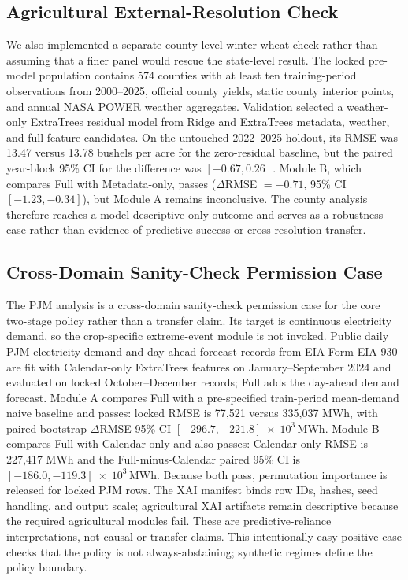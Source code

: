 \documentclass[conference]{IEEEtran}
\begin{document}
\subsection{Agricultural External-Resolution Check}
We also implemented a separate county-level winter-wheat check rather than
assuming that a finer panel would rescue the state-level result. The locked
pre-model population contains 574 counties with at least ten training-period
observations from 2000--2025, official county yields, static county interior
points, and annual NASA POWER weather aggregates. Validation selected a
weather-only ExtraTrees residual model from Ridge and ExtraTrees metadata,
weather, and full-feature candidates. On the untouched 2022--2025 holdout, its
RMSE was 13.47 versus 13.78 bushels per acre for the zero-residual baseline, but
the paired year-block 95\% CI for the difference was $[-0.67,0.26]$. Module B,
which compares Full with Metadata-only, passes ($\Delta$RMSE $=-0.71$, 95\% CI
$[-1.23,-0.34]$), but Module A remains inconclusive. The county analysis therefore
reaches a model-descriptive-only outcome and serves as a robustness case rather
than evidence of predictive success or cross-resolution transfer.

\subsection{Cross-Domain Sanity-Check Permission Case}
The PJM analysis is a cross-domain sanity-check permission case for the core
two-stage policy rather than a transfer claim. Its target is continuous electricity
demand, so the crop-specific extreme-event module is not invoked. Public daily PJM
electricity-demand and day-ahead forecast records from EIA Form EIA-930
\cite{EIA930} are fit with Calendar-only ExtraTrees features on
January--September 2024 and evaluated on locked October--December records; Full
adds the day-ahead demand forecast. Module A compares Full with a pre-specified
train-period mean-demand naive baseline and passes: locked RMSE is 77,521 versus
335,037 MWh, with paired bootstrap $\Delta$RMSE 95\% CI
$[-296.7, -221.8]\;\times\;10^3\,\mathrm{MWh}$. Module B compares Full with Calendar-only and
also passes: Calendar-only RMSE is 227,417 MWh and the Full-minus-Calendar paired
95\% CI is $[-186.0, -119.3]\;\times\;10^3\,\mathrm{MWh}$. Because both pass, permutation
importance is released for locked PJM rows. The XAI manifest binds row IDs,
hashes, seed handling, and output scale; agricultural XAI artifacts remain
descriptive because the required agricultural modules fail. These are predictive-reliance
interpretations, not causal or transfer claims. This intentionally easy positive
case checks that the policy is not always-abstaining; synthetic regimes define the
policy boundary.
\end{document}
